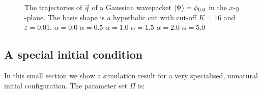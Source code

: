 \begin{figure}
{  } \\
   \\
  \caption[Trajectories of position for a missed intersection]{
    The trajectories of $\vec{q}$ of a Gaussian wavepacket $\Ket{\Psi} = \phi_{0,0}$ in the $x$-$y$-plane.
    The basis shape is a hyperbolic cut with cut-off $K = 16$ and $\varepsilon = 0.01$.
     $\alpha = 0.0$
     $\alpha = 0.5$
     $\alpha = 1.0$
     $\alpha = 1.5$
     $\alpha = 2.0$
     $\alpha = 5.0$
    \label{fig:conic_missed_16_trajectories}
  }
\end{figure}


\FloatBarrier
\subsection{A special initial condition}


In this small section we show a simulation result for a very
specialised, unnatural initial configuration. The parameter set $\Pi$ is:

